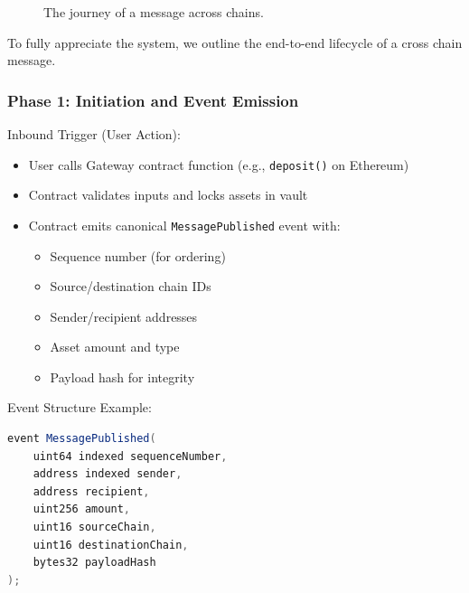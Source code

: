 \documentclass[11pt,a4paper]{article}
\begin{document}
\begin{figure}[H]
\centering
{}
\caption{The journey of a message across chains.}
\end{figure}

To fully appreciate the system, we outline the end-to-end lifecycle of a cross chain message.


\subsubsection*{Phase 1: Initiation and Event Emission}

Inbound Trigger (User Action):
\begin{itemize}
    \item User calls Gateway contract function (e.g., \texttt{deposit()} on Ethereum)
    \item Contract validates inputs and locks assets in vault
    \item Contract emits canonical \texttt{MessagePublished} event with:
        \begin{itemize}
            \item Sequence number (for ordering)
            \item Source/destination chain IDs
            \item Sender/recipient addresses
            \item Asset amount and type
            \item Payload hash for integrity
        \end{itemize}
\end{itemize}

Event Structure Example:
\begin{lstlisting}[language=Java, caption={Solidity Event Definition}]
event MessagePublished(
    uint64 indexed sequenceNumber,
    address indexed sender,
    address recipient,
    uint256 amount,
    uint16 sourceChain,
    uint16 destinationChain,
    bytes32 payloadHash
);
\end{lstlisting}
\end{document}
